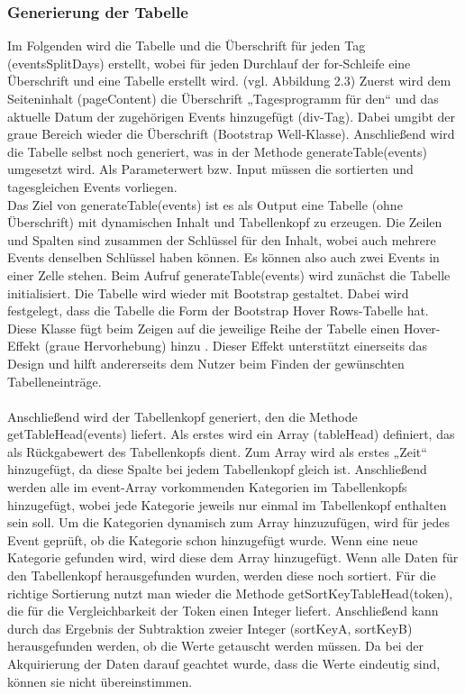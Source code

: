 \subsubsection{Generierung der Tabelle}
Im Folgenden wird die Tabelle und die Überschrift für jeden Tag (eventsSplitDays) erstellt, wobei für jeden Durchlauf der for-Schleife eine Überschrift und eine Tabelle erstellt wird. (vgl. Abbildung 2.3) Zuerst wird dem Seiteninhalt (pageContent) die Überschrift „Tagesprogramm für den“ und das aktuelle Datum der zugehörigen Events hinzugefügt (div-Tag). Dabei umgibt der graue Bereich wieder die Überschrift (Bootstrap Well-Klasse). 
Anschließend wird die Tabelle selbst noch generiert, was in der Methode generateTable(events) umgesetzt wird. Als Parameterwert bzw. Input müssen die sortierten und tagesgleichen Events vorliegen. \\
Das Ziel von generateTable(events) ist es als Output eine Tabelle (ohne Überschrift) mit dynamischen Inhalt und Tabellenkopf zu erzeugen. Die Zeilen und Spalten sind zusammen der Schlüssel für den Inhalt, wobei auch mehrere Events denselben Schlüssel haben können. Es können also auch zwei Events in einer Zelle stehen. 
Beim Aufruf generateTable(events) wird zunächst die Tabelle initialisiert. Die Tabelle wird wieder mit Bootstrap gestaltet. Dabei wird festgelegt, dass die Tabelle die Form der Bootstrap Hover Rows-Tabelle hat. Diese Klasse fügt beim Zeigen auf die jeweilige Reihe der Tabelle einen Hover-Effekt (graue Hervorhebung) hinzu \cite{table}.  Dieser Effekt unterstützt einerseits das Design und hilft andererseits dem Nutzer beim Finden der gewünschten Tabelleneinträge. \\
\\
Anschließend wird der Tabellenkopf generiert, den die Methode getTableHead(events) liefert. Als erstes wird ein Array (tableHead) definiert, das als Rückgabewert des Tabellenkopfs dient. Zum Array wird als erstes „Zeit“ hinzugefügt, da diese Spalte bei jedem Tabellenkopf gleich ist. Anschließend werden alle im event-Array vorkommenden Kategorien im Tabellenkopfs hinzugefügt, wobei jede Kategorie jeweils nur einmal im Tabellenkopf enthalten sein soll. Um die Kategorien dynamisch zum Array hinzuzufügen, wird für jedes Event geprüft, ob die Kategorie schon hinzugefügt wurde. Wenn eine neue Kategorie gefunden wird, wird diese dem Array hinzugefügt. Wenn alle Daten für den Tabellenkopf herausgefunden wurden, werden diese noch sortiert. Für die richtige Sortierung nutzt man wieder die Methode getSortKeyTableHead(token), die für die Vergleichbarkeit der Token einen Integer liefert. Anschließend kann durch das Ergebnis der Subtraktion zweier Integer (sortKeyA, sortKeyB) herausgefunden werden, ob die Werte getauscht werden müssen. Da bei der Akquirierung der Daten darauf geachtet wurde, dass die Werte eindeutig sind, können sie nicht übereinstimmen.
